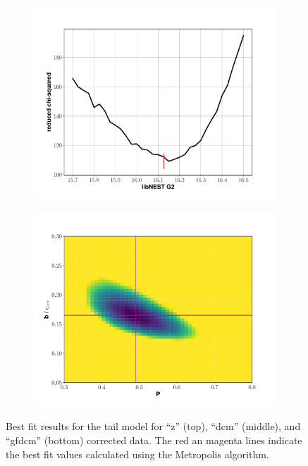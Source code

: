 \begin{figure}[h!]
\begin{subfigure}{0.5\textwidth}
  \includegraphics[width=\textwidth]{Figures/S2tail_g2fit_gfdcm.pdf}
\end{subfigure}%
\begin{subfigure}{0.5\textwidth}
  \centering
  \includegraphics[width=\textwidth]{Figures/S2tail_heatmap_gfdcm.pdf}
\end{subfigure}
\caption{Best fit results for the tail model for ``z'' (top), ``dcm'' (middle), and ``gfdcm'' (bottom) corrected data. The red an magenta lines indicate the best fit values calculated using the Metropolis algorithm.}
\label{fig:s2bestfit}
\end{figure}

